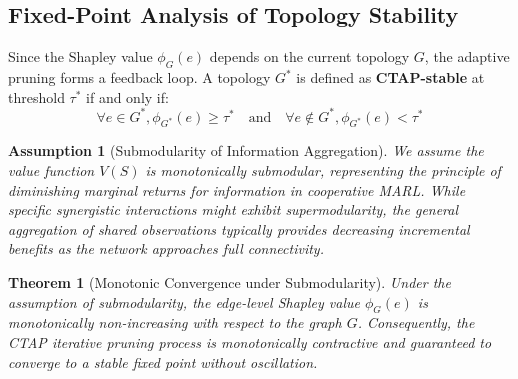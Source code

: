 \documentclass{article}
\newtheorem{theorem}{Theorem}
\newtheorem{assumption}{Assumption}
\begin{document}
\subsection{Fixed-Point Analysis of Topology Stability}
Since the Shapley value $\phi_G(e)$ depends on the current topology $G$, the adaptive pruning forms a feedback loop. A topology $G^*$ is defined as \textbf{CTAP-stable} at threshold $\tau^*$ if and only if:
\begin{equation}
    \forall e \in G^*, \phi_{G^*}(e) \ge \tau^* \quad \text{and} \quad \forall e \notin G^*, \phi_{G^*}(e) < \tau^*
\end{equation}

\begin{assumption}[Submodularity of Information Aggregation]
We assume the value function $V(S)$ is monotonically submodular, representing the principle of diminishing marginal returns for information in cooperative MARL. While specific synergistic interactions might exhibit supermodularity, the general aggregation of shared observations typically provides decreasing incremental benefits as the network approaches full connectivity.
\end{assumption}

\begin{theorem}[Monotonic Convergence under Submodularity]
Under the assumption of submodularity, the edge-level Shapley value $\phi_G(e)$ is monotonically non-increasing with respect to the graph $G$. Consequently, the CTAP iterative pruning process is monotonically contractive and guaranteed to converge to a stable fixed point without oscillation.
\end{theorem}
\end{document}
